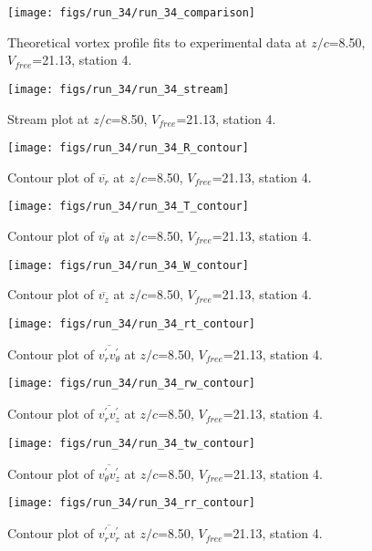 \begin{figure}[H]
\centering
\texttt{[image: figs/run\_34/run\_34\_comparison]}
\caption{Theoretical vortex profile fits to experimental data at $z/c$=8.50, $V_{free}$=21.13, station 4.}
\end{figure}


\begin{figure}[H]
\centering
\texttt{[image: figs/run\_34/run\_34\_stream]}
\caption{Stream plot at $z/c$=8.50, $V_{free}$=21.13, station 4.}
\end{figure}


\begin{figure}[H]
\centering
\texttt{[image: figs/run\_34/run\_34\_R\_contour]}
\caption{Contour plot of $\overline{v_{r}}$ at $z/c$=8.50, $V_{free}$=21.13, station 4.}
\end{figure}


\begin{figure}[H]
\centering
\texttt{[image: figs/run\_34/run\_34\_T\_contour]}
\caption{Contour plot of $\overline{v_{\theta}}$ at $z/c$=8.50, $V_{free}$=21.13, station 4.}
\end{figure}


\begin{figure}[H]
\centering
\texttt{[image: figs/run\_34/run\_34\_W\_contour]}
\caption{Contour plot of $\overline{v_{z}}$ at $z/c$=8.50, $V_{free}$=21.13, station 4.}
\end{figure}


\begin{figure}[H]
\centering
\texttt{[image: figs/run\_34/run\_34\_rt\_contour]}
\caption{Contour plot of $\overline{v_{r}^{\prime} v_{\theta}^{\prime}}$ at $z/c$=8.50, $V_{free}$=21.13, station 4.}
\end{figure}


\begin{figure}[H]
\centering
\texttt{[image: figs/run\_34/run\_34\_rw\_contour]}
\caption{Contour plot of $\overline{v_{r}^{\prime} v_{z}^{\prime}}$ at $z/c$=8.50, $V_{free}$=21.13, station 4.}
\end{figure}


\begin{figure}[H]
\centering
\texttt{[image: figs/run\_34/run\_34\_tw\_contour]}
\caption{Contour plot of $\overline{v_{\theta}^{\prime} v_{z}^{\prime}}$ at $z/c$=8.50, $V_{free}$=21.13, station 4.}
\end{figure}


\begin{figure}[H]
\centering
\texttt{[image: figs/run\_34/run\_34\_rr\_contour]}
\caption{Contour plot of $\overline{v_{r}^{\prime} v_{r}^{\prime}}$ at $z/c$=8.50, $V_{free}$=21.13, station 4.}
\end{figure}


